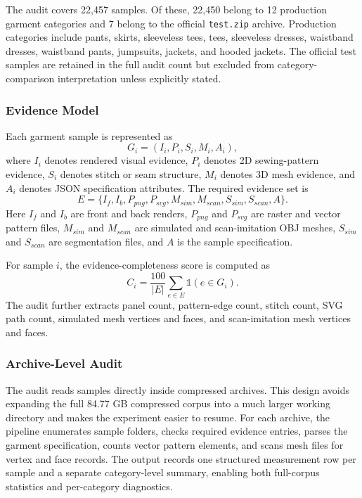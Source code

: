 \documentclass[pdflatex,sn-mathphys-num]{sn-jnl}
\begin{document}
The audit covers 22,457 samples. Of these, 22,450 belong to 12 production garment categories and 7 belong to the official \texttt{test.zip} archive. Production categories include pants, skirts, sleeveless tees, tees, sleeveless dresses, waistband dresses, waistband pants, jumpsuits, jackets, and hooded jackets. The official test samples are retained in the full audit count but excluded from category-comparison interpretation unless explicitly stated.

\subsubsection{Evidence Model}

Each garment sample is represented as
\begin{equation}
G_i = (I_i, P_i, S_i, M_i, A_i),
\end{equation}
where $I_i$ denotes rendered visual evidence, $P_i$ denotes 2D sewing-pattern evidence, $S_i$ denotes stitch or seam structure, $M_i$ denotes 3D mesh evidence, and $A_i$ denotes JSON specification attributes. The required evidence set is
\begin{equation}
E = \{I_f,I_b,P_{png},P_{svg},M_{sim},M_{scan},S_{sim},S_{scan},A\}.
\end{equation}
Here $I_f$ and $I_b$ are front and back renders, $P_{png}$ and $P_{svg}$ are raster and vector pattern files, $M_{sim}$ and $M_{scan}$ are simulated and scan-imitation OBJ meshes, $S_{sim}$ and $S_{scan}$ are segmentation files, and $A$ is the sample specification.

For sample $i$, the evidence-completeness score is computed as
\begin{equation}
C_i=\frac{100}{|E|}\sum_{e\in E}\mathbb{1}(e\in G_i).
\end{equation}
The audit further extracts panel count, pattern-edge count, stitch count, SVG path count, simulated mesh vertices and faces, and scan-imitation mesh vertices and faces.

\subsubsection{Archive-Level Audit}

The audit reads samples directly inside compressed archives. This design avoids expanding the full 84.77 GB compressed corpus into a much larger working directory and makes the experiment easier to resume. For each archive, the pipeline enumerates sample folders, checks required evidence entries, parses the garment specification, counts vector pattern elements, and scans mesh files for vertex and face records. The output records one structured measurement row per sample and a separate category-level summary, enabling both full-corpus statistics and per-category diagnostics.
\end{document}
